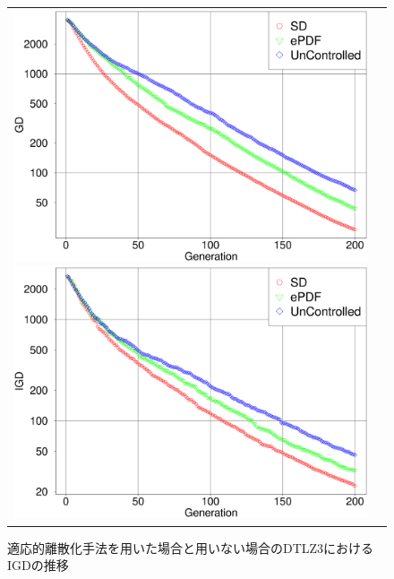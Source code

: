 \documentclass[../main/main]{subfiles}
\begin{document}
\begin{figure}[!ht]
\begin{tabular}{cc}
\begin{minipage}{0.49\hsize}
\includegraphics[width=1\linewidth]{../figures/DTLZ3_GD.eps}
\caption{適応的離散化手法を用いた場合と用いない場合のDTLZ3におけるGDの推移}
\label{dtlz3_gd_transition}
\end{minipage}
\begin{minipage}{0.49\hsize}
\includegraphics[width=1\linewidth]{../figures/DTLZ3_IGD.eps}
\caption{適応的離散化手法を用いた場合と用いない場合のDTLZ3におけるIGDの推移}
\label{dtlz3_igd_transition}
\end{minipage}
\end{tabular}
\end{figure}
\end{document}
